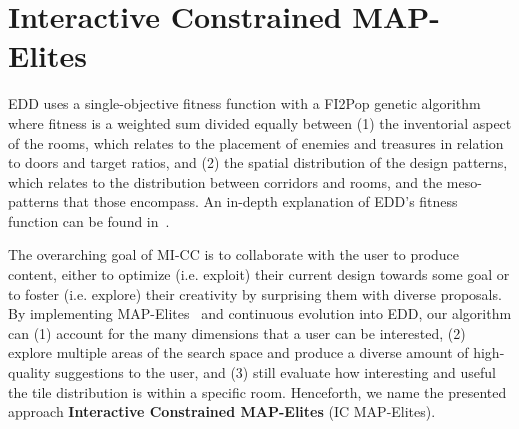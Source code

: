 \documentclass[conference]{IEEEtran}
\begin{document}
\section{Interactive Constrained MAP-Elites\label{section:illuminating}}



EDD uses a single-objective fitness function with a FI2Pop genetic algorithm where fitness is a weighted sum divided equally between (1) the inventorial aspect of the rooms, which relates to the placement of enemies and treasures in relation to doors and target ratios, and (2) the spatial distribution of the design patterns, which relates to the distribution between corridors and rooms, and the meso-patterns that those encompass. An in-depth explanation of EDD's fitness function can be found in~\cite{Alvarez2018a, Baldwin2017}.

The overarching goal of MI-CC is to collaborate with the user to produce content, either to optimize (i.e. exploit) their current design towards some goal or to foster (i.e. explore) their creativity by surprising them with diverse proposals. By implementing MAP-Elites~\cite{Mouret2015} and continuous evolution into EDD, our algorithm can (1) account for the many dimensions that a user can be interested, (2) explore multiple areas of the search space and produce a diverse amount of high-quality suggestions to the user, and (3) still evaluate how interesting and useful the tile distribution is within a specific room. Henceforth, we name the presented approach \textbf{Interactive Constrained MAP-Elites} (IC MAP-Elites). 
\end{document}
